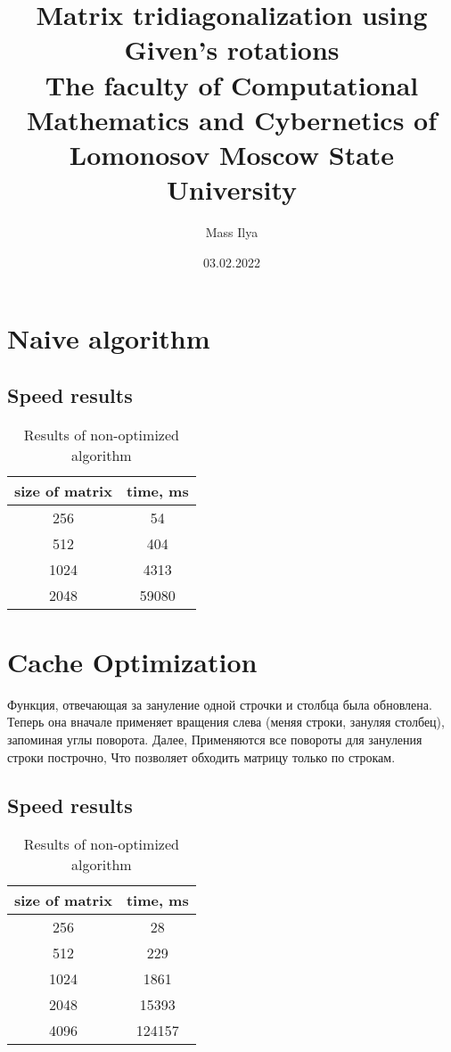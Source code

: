 \documentclass[12pt]{report}
\begin{document}
	\title{
		{Matrix tridiagonalization using Given's rotations}\\
		{\large The faculty of Computational Mathematics and Cybernetics of Lomonosov Moscow State University}\\
	}
	\author{Mass Ilya}
	\date{03.02.2022}
	
	\maketitle
	
	\chapter{Naive algorithm}
	
	
	\section{Speed results}
	\begin{table}[h!]
		\centering
		\begin{tabular}{ | c | c | } 
			\hline
			size of matrix & time, ms\\  [0.5ex] 
			\hline\hline
			256 & 54 \\ 
			\hline
			512 & 404 \\ 
			\hline
			1024 & 4313 \\
			\hline
			2048 & 59080 \\
			\hline
		\end{tabular}
		\caption{Results of non-optimized algorithm}
	\end{table}  

	\chapter{Cache Optimization}
	Функция, отвечающая за зануление одной строчки и столбца была обновлена. Теперь она вначале применяет вращения слева
	(меняя строки, зануляя столбец), запоминая углы поворота. Далее, Применяются все повороты для зануления строки построчно,
	Что позволяет обходить матрицу только по строкам.

	\section{Speed results}
	\begin{table}[h!]
		\centering
		\begin{tabular}{ | c | c | }
			\hline
			size of matrix & time, ms\\  [0.5ex]
			\hline\hline
			256 & 28 \\
			\hline
			512 & 229 \\
			\hline
			1024 & 1861 \\
			\hline
			2048 & 15393 \\
			\hline
			4096 & 124157 \\
			\hline
		\end{tabular}
		\caption{Results of non-optimized algorithm}
	\end{table}
\end{document}
